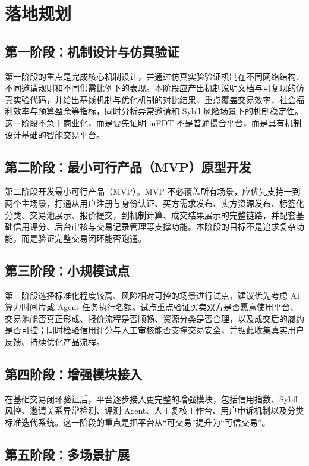 \documentclass[UTF8,a4paper,12pt]{ctexart}
\begin{document}
\newpage
\section{落地规划}

\subsection{第一阶段：机制设计与仿真验证}

第一阶段的重点是完成核心机制设计，并通过仿真实验验证机制在不同网络结构、不同邀请规则和不同供需比例下的表现。本阶段应产出机制说明文档与可复现的仿真实验代码，并给出基线机制与优化机制的对比结果，重点覆盖交易效率、社会福利效率与预算盈余等指标，同时分析异常邀请和 Sybil 风险场景下的机制稳定性。这一阶段不急于商业化，而是要先证明 inFDT 不是普通撮合平台，而是具有机制设计基础的智能交易平台。

\subsection{第二阶段：最小可行产品（MVP）原型开发}

第二阶段开发最小可行产品（MVP）。MVP 不必覆盖所有场景，应优先支持一到两个主场景，打通从用户注册与身份认证、买方需求发布、卖方资源发布、标签化分类、交易池展示、报价提交，到机制计算、成交结果展示的完整链路，并配套基础信用评分、后台审核与交易记录管理等支撑功能。本阶段的目标不是追求复杂功能，而是验证完整交易闭环能否跑通。

\subsection{第三阶段：小规模试点}

第三阶段选择标准化程度较高、风险相对可控的场景进行试点，建议优先考虑 AI 算力时间片或 Agent 任务执行名额。试点重点验证买卖双方是否愿意使用平台、交易池能否真正形成、报价流程是否顺畅、资源分类是否合理，以及成交后的履约是否可控；同时检验信用评分与人工审核能否支撑交易安全，并据此收集真实用户反馈、持续优化产品流程。

\subsection{第四阶段：增强模块接入}

在基础交易闭环验证后，平台逐步接入更完整的增强模块，包括信用指数、Sybil 风控、邀请关系异常检测、评测 Agent、人工复核工作台、用户申诉机制以及分类标准迭代系统。这一阶段的重点是把平台从“可交易”提升为“可信交易”。

\subsection{第五阶段：多场景扩展}
\end{document}
